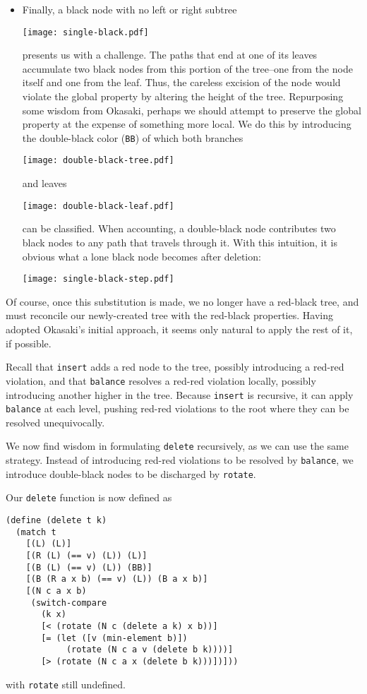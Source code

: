 \documentclass[preprint]{sigplanconf}
\begin{document}
\begin{itemize}
\item Finally, a black node with no left or right subtree
\begin{center}
\texttt{[image: single-black.pdf]}
\end{center}
presents us with a challenge. The paths that end at one of its leaves accumulate two black nodes from this portion of the tree--one from the node itself and one from the leaf. Thus, the careless excision of the node would violate the global property by altering the height of the tree. Repurposing some wisdom from Okasaki, perhaps we should attempt to preserve the global property at the expense of something more local. We do this by introducing the double-black color (\texttt{BB}) of which both branches
\begin{center}
\texttt{[image: double-black-tree.pdf]}
\end{center}
and leaves
\begin{center}
\texttt{[image: double-black-leaf.pdf]}
\end{center}
can be classified. When accounting, a double-black node contributes two black nodes to any path that travels through it. With this intuition, it is obvious what a lone black node becomes after deletion:
\begin{center}
\texttt{[image: single-black-step.pdf]}
\end{center}

\end{itemize}

Of course, once this substitution is made, we no longer have a red-black tree, and must reconcile our newly-created tree with the red-black properties. Having adopted Okasaki's initial approach, it seems only natural to apply the rest of it, if possible.

Recall that \texttt{insert} adds a red node to the tree, possibly introducing a red-red violation, and that \texttt{balance} resolves a red-red violation locally, possibly introducing another higher in the tree. Because \texttt{insert} is recursive, it can apply \texttt{balance} at each level, pushing red-red violations to the root where they can be resolved unequivocally.

We now find wisdom in formulating \texttt{delete} recursively, as we can use the same strategy. Instead of introducing red-red violations to be resolved by \texttt{balance}, we introduce double-black nodes to be discharged by \texttt{rotate}.

Our \texttt{delete} function is now defined as
\begin{verbatim}
(define (delete t k)
  (match t
    [(L) (L)]
    [(R (L) (== v) (L)) (L)]
    [(B (L) (== v) (L)) (BB)]
    [(B (R a x b) (== v) (L)) (B a x b)]
    [(N c a x b)
     (switch-compare
       (k x)
       [< (rotate (N c (delete a k) x b))]
       [= (let ([v (min-element b)])
            (rotate (N c a v (delete b k))))]
       [> (rotate (N c a x (delete b k)))])]))
\end{verbatim}
with \texttt{rotate} still undefined.
\end{document}
